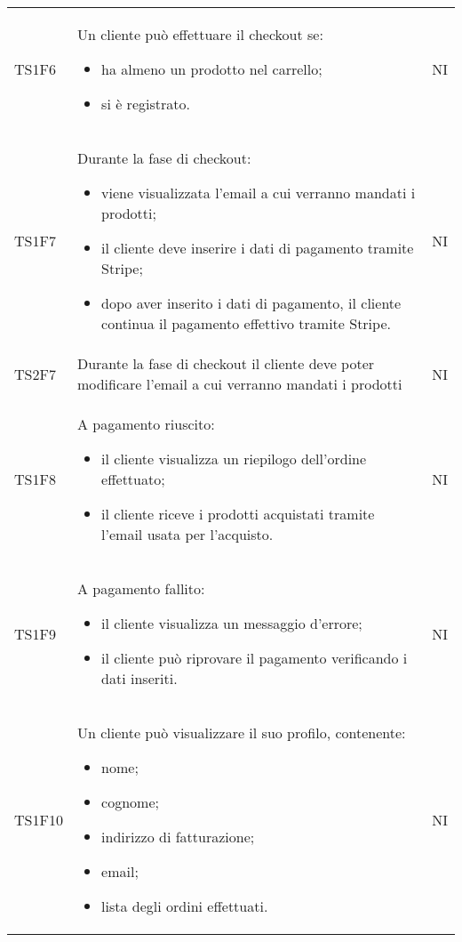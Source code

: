 {\begin{longtable}{C{3cm} C{10.2cm} C{1.5cm}}
TS1F6 & Un cliente può effettuare il checkout se:
\begin{itemize}
	\item ha almeno un prodotto nel carrello;
	\item si è registrato.
\end{itemize}
& NI\\

TS1F7 & Durante la fase di checkout:
\begin{itemize}
	\item viene visualizzata l'email a cui verranno mandati i prodotti;
	\item il cliente deve inserire i dati di pagamento tramite Stripe;
	\item dopo aver inserito i dati di pagamento, il cliente continua il pagamento effettivo tramite Stripe.
\end{itemize}
& NI\\

TS2F7 & Durante la fase di checkout il cliente deve poter modificare l'email a cui verranno mandati i prodotti
& NI\\

TS1F8 & A pagamento riuscito:
\begin{itemize}
	\item il cliente visualizza un riepilogo dell'ordine effettuato;
	\item il cliente riceve i prodotti acquistati tramite l'email usata per l'acquisto.
\end{itemize}
& NI\\

TS1F9 & A pagamento fallito:
\begin{itemize}
	\item il cliente visualizza un messaggio d'errore;
	\item il cliente può riprovare il pagamento verificando i dati inseriti.
\end{itemize}
& NI\\


TS1F10 & Un cliente può visualizzare il suo profilo, contenente:
\begin{itemize}
	\item nome;
	\item cognome;
	\item indirizzo di fatturazione;
	\item email;
	\item lista degli ordini effettuati.
\end{itemize}
& NI\\


\end{longtable}}
